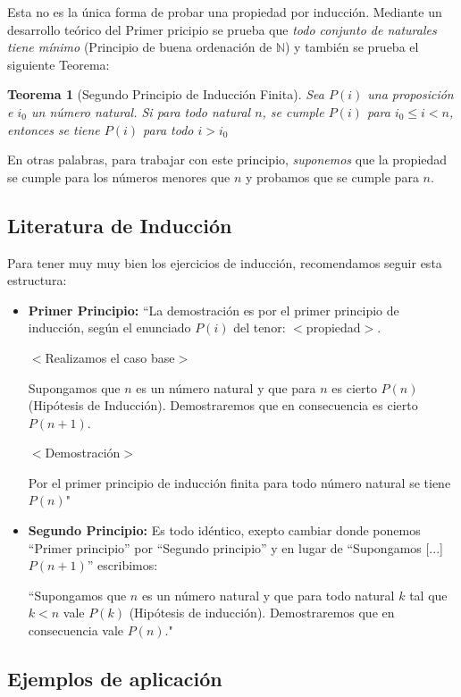 \documentclass[a4paper]{article}
\theoremstyle{plain} \newtheorem{PrimerPrincipio}{Teorema}
\theoremstyle{plain} \newtheorem{SegundoPrincipio}{Teorema}
\begin{document}
Esta no es la única forma de probar una propiedad por inducción. Mediante un desarrollo teórico del Primer pricipio se prueba que \emph{todo conjunto de naturales tiene mínimo } (Principio de buena ordenación de $\mathbb{N}$) y también se prueba el siguiente Teorema:

\begin{SegundoPrincipio}[Segundo Principio de Inducción Finita]
				Sea $P(i)$ una proposición e $i_0$ un número natural. Si para todo natural $n$, se cumple $P(i)$ para $i_0 \le i < n$, entonces se tiene $P(i)$ para todo $i > i_0$
\end{SegundoPrincipio}

En otras palabras, para trabajar con este principio, \emph{suponemos} que la propiedad se cumple para los números menores que $n$ y probamos que se cumple para $n$.

\subsection{Literatura de Inducción}

Para tener muy muy bien los ejercicios de inducción, recomendamos seguir esta estructura:

\begin{itemize}
				\item \textbf{Primer Principio:} ``La demostración es por el primer principio de inducción, según el enunciado $P(i)$ del tenor: $<$propiedad$>$.

$<$Realizamos el caso base$>$

Supongamos que $n$ es un número natural y que para $n$ es cierto $P(n)$ (Hipótesis de Inducción). Demostraremos que en consecuencia es cierto $P(n+1)$.

$<$Demostración$>$

Por el primer principio de inducción finita para todo número natural se tiene $P(n)$"

\item \textbf{Segundo Principio:} Es todo idéntico, exepto cambiar donde ponemos ``Primer principio'' por ``Segundo principio'' y en lugar de ``Supongamos [...] $P(n+1)$'' escribimos:

				``Supongamos que $n$ es un número natural y que para todo natural $k$ tal que $k<n$ vale $P(k)$ (Hipótesis de inducción). Demostraremos que en consecuencia vale $P(n)$."
\end{itemize}
\subsection{Ejemplos de aplicación}
\end{document}
